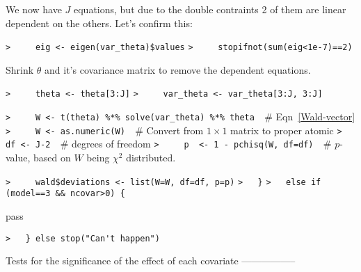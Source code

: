 \documentclass[a4paper]{article}
\begin{document}
We now have $J$ equations, but due to the double contraints 2 of them are linear
dependent on the others. Let's confirm this:\par
\verb~>     eig <- eigen(var_theta)$values~\newline
\verb~>     stopifnot(sum(eig<1e-7)==2)~\par

Shrink $\theta$ and it's covariance matrix to remove the dependent equations.\par
\verb~>     theta <- theta[3:J]~\newline
\verb~>     var_theta <- var_theta[3:J, 3:J]~\par

\verb~>     W <- t(theta) %*% solve(var_theta) %*% theta  ~{\sffamily\# Eqn~\eqref{Wald-vector}}\newline
\verb~>     W <- as.numeric(W)  ~{\sffamily\# Convert from $1\times1$ matrix to proper atomic}\newline
\verb~>     df <- J-2  ~{\sffamily\# degrees of freedom}\newline
\verb~>     p  <- 1 - pchisq(W, df=df)  ~{\sffamily\# $p$-value, based on $W$ being $\chi^2$ distributed.}\par

\verb~>     wald$deviations <- list(W=W, df=df, p=p)~\newline
\verb~>   }~\newline
\verb~>   else if (model==3 && ncovar>0) {~\par
pass\par
\verb~>   } else stop("Can't happen")~\par

Tests for the significance of the effect of each covariate -----------------\par
\end{document}
